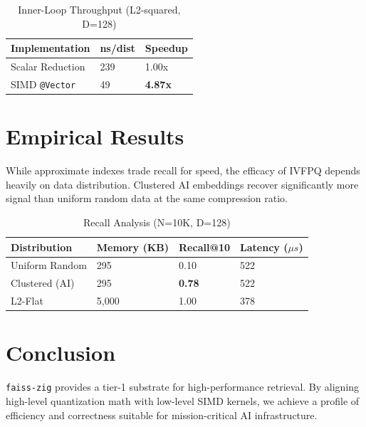 \documentclass[11pt]{article}
\begin{document}
\begin{table}[h]
\centering
\caption{Inner-Loop Throughput (L2-squared, D=128)}
\begin{tabular}{@{}lll@{}}
\toprule
Implementation & ns/dist & Speedup \\ \midrule
Scalar Reduction & 239 & 1.00x \\
SIMD \texttt{@Vector} & 49 & \textbf{4.87x} \\ \bottomrule
\end{tabular}
\end{table}

\section{Empirical Results}
While approximate indexes trade recall for speed, the efficacy of IVFPQ depends heavily on data distribution. Clustered AI embeddings recover significantly more signal than uniform random data at the same compression ratio.

\begin{table}[h]
\centering
\caption{Recall Analysis (N=10K, D=128)}
\begin{tabular}{@{}llll@{}}
\toprule
Distribution & Memory (KB) & Recall@10 & Latency ($\mu s$) \\ \midrule
Uniform Random & 295 & 0.10 & 522 \\
Clustered (AI) & 295 & \textbf{0.78} & 522 \\
L2-Flat & 5,000 & 1.00 & 378 \\ \bottomrule
\end{tabular}
\end{table}

\section{Conclusion}
\texttt{faiss-zig} provides a tier-1 substrate for high-performance retrieval. By aligning high-level quantization math with low-level SIMD kernels, we achieve a profile of efficiency and correctness suitable for mission-critical AI infrastructure.
\end{document}
